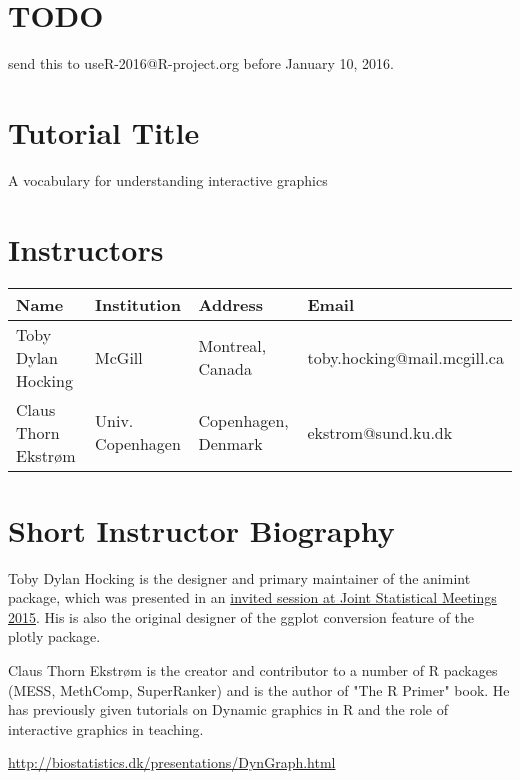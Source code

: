 \documentclass[11pt]{article}
\author{Toby Dylan Hocking}
\date{\today}
\title{}
\begin{document}
\tableofcontents

\section{{\bfseries\sffamily TODO} }
\label{sec:orgheadline1}

send this to useR-2016@R-project.org before January 10, 2016.

\section{Tutorial Title}
\label{sec:orgheadline2}

A vocabulary for understanding interactive graphics

\section{Instructors}
\label{sec:orgheadline3}

\begin{center}
\begin{tabular}{llll}
Name & Institution & Address & Email\\
\hline
Toby Dylan Hocking & McGill & Montreal, Canada & toby.hocking@mail.mcgill.ca\\
Claus Thorn Ekstrøm & Univ. Copenhagen & Copenhagen, Denmark & ekstrom@sund.ku.dk\\
\end{tabular}
\end{center}

\section{Short Instructor Biography}
\label{sec:orgheadline4}

Toby Dylan Hocking is the designer and primary maintainer of the
animint package, which was presented in an \href{https://www.amstat.org/meetings/jsm/2015/onlineprogram/AbstractDetails.cfm?abstractid=314184\%0A}{invited session at Joint
Statistical Meetings 2015}. His is also the original designer of the
ggplot conversion feature of the plotly package.

Claus Thorn Ekstrøm is the creator and contributor to a number of R
packages (MESS, MethComp, SuperRanker) and is the author of "The R
Primer" book. He has previously given tutorials on Dynamic
graphics in R and the role of interactive graphics in teaching.

\url{http://biostatistics.dk/presentations/DynGraph.html}
\end{document}
